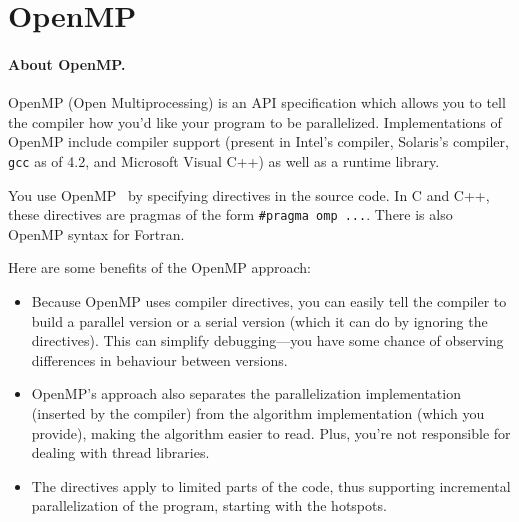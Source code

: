 




\section*{OpenMP}

\paragraph{About OpenMP.} OpenMP (Open Multiprocessing) 
is an API specification which allows you to tell the compiler how you'd 
like your program to be parallelized. Implementations of OpenMP 
include compiler support (present in Intel's compiler, Solaris's 
compiler, {\tt gcc} as of 4.2, and Microsoft Visual C++) as well as a 
runtime library.

You use OpenMP~\cite{omptutorial} by specifying
directives in the source code. In C and C++, these directives are
pragmas of the form \verb+#pragma omp ...+. There is also OpenMP
syntax for Fortran. 

Here are some benefits of the OpenMP approach:
\begin{itemize}
\item Because OpenMP uses compiler directives, you can easily tell the
  compiler to build a parallel version or a serial version (which it can do by
  ignoring the directives). This can simplify debugging---you
  have some chance of observing differences in behaviour between 
  versions.
\item OpenMP's approach also separates the parallelization
  implementation (inserted by the compiler) from the algorithm
  implementation (which you provide), making the algorithm easier to
  read. Plus, you're not responsible for dealing with thread libraries.
\item The directives apply to limited parts of the code, thus supporting
  incremental parallelization of the program, starting with the hotspots.
\end{itemize}

